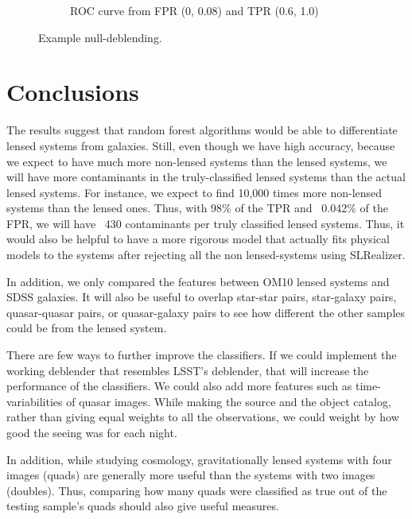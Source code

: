 \documentclass[\docopts]{\docclass}
\begin{document}
\begin{figure}
\begin{subfigure}[bt]{0.48\linewidth}
        \caption{ROC curve from FPR (0, 0.08) and TPR (0.6, 1.0)}
         \label{fig:ML Magnified}
    \end{subfigure}
    \caption{Example null-deblending.}
    \label{fig:null-deblend}
\end{figure}


\section{Conclusions}
\label{sec:conclusions}

The results suggest that random forest algorithms would be able to differentiate lensed systems from galaxies. Still, even though we have high accuracy, because we expect to have much more non-lensed systems than the lensed systems, we will have more contaminants in the truly-classified lensed systems than the actual lensed systems. For instance, we expect to find 10,000 times more non-lensed systems than the lensed ones. Thus, with 98\% of the TPR and ~0.042\% of the FPR, we will have ~430 contaminants per truly classified lensed systems. Thus, it would also be helpful to have a more rigorous model that actually fits physical models to the systems after rejecting all the non lensed-systems using SLRealizer.

In addition, we only compared the features between OM10 lensed systems and SDSS galaxies. It will also be useful to overlap star-star pairs, star-galaxy pairs, quasar-quasar pairs, or quasar-galaxy pairs to see how different the other samples could be from the lensed system.

There are few ways to further improve the classifiers. If we could implement the working deblender that resembles LSST’s deblender, that will increase the performance of the classifiers. We could also add more features such as time-variabilities of quasar images. While making the source and the object catalog, rather than giving equal weights to all the observations, we could weight by how good the seeing was for each night.

In addition, while studying cosmology, gravitationally lensed systems with four images (quads) are generally more useful than the systems with two images (doubles). Thus, comparing how many quads were classified as true out of the testing sample’s quads should also give useful measures.
\end{document}
